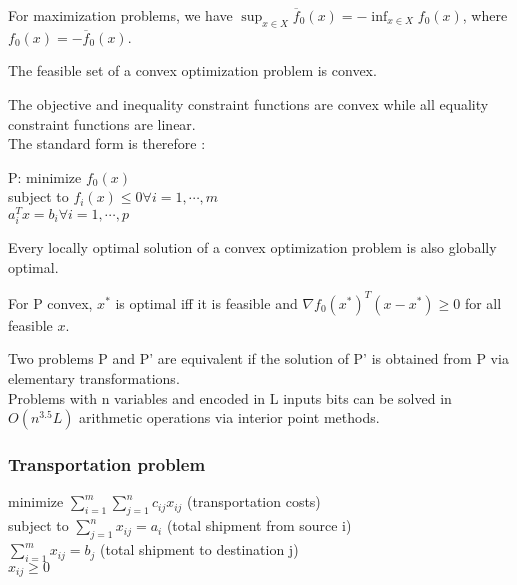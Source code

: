 \documentclass[../main.tex]{subfiles}
\begin{document}
For maximization problems, we have $\sup_{x \in X}\overline{f}_0(x) = -\inf_{x \in X} f_0(x)$, where $f_0(x) = -\overline{f}_0(x)$.\\

\begin{theorem}
    The feasible set of a convex optimization problem is convex.
\end{theorem}

The objective and inequality constraint functions are convex while all equality constraint functions are linear.\\
The standard form is therefore : \begin{center}
    P: minimize $f_0(x)$\\
    subject to $f_i(x) \leq 0 \forall i=1, \cdots, m$\\
    $a_i^T x = b_i \forall i=1, \cdots, p$
\end{center}

\begin{theorem}
    Every locally optimal solution of a convex optimization problem is also globally optimal.
\end{theorem}

\begin{theorem}
    For P convex, $x^*$ is optimal iff it is feasible and $\nabla f_0(x^*)^T (x-x^*) \geq 0$ for all feasible $x$.
\end{theorem}

Two problems P and P' are equivalent if the solution of P' is obtained from P via elementary transformations.\\

\warning Problems with n variables and encoded in L inputs bits can be solved in $O(n^{3.5} L)$ arithmetic operations via interior point methods.\\

\subsubsection{Transportation problem}
\begin{center}
    minimize $\sum_{i=1}^m \sum_{j=1}^n c_{ij} x_{ij}$ (transportation costs)\\
    subject to $\sum_{j=1}^n x_{ij} = a_i$ (total shipment from source i)\\
    $\sum_{i=1}^m x_{ij} = b_j$ (total shipment to destination j)\\
    $x_{ij} \geq 0$\\
\end{center}
\end{document}
